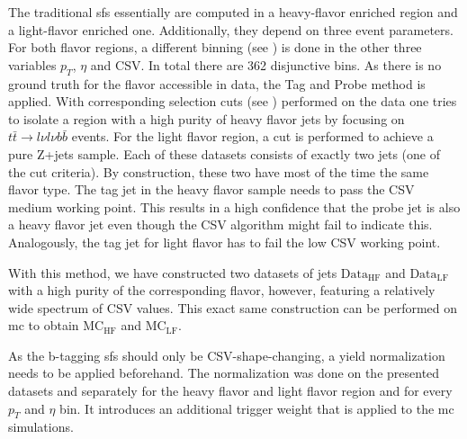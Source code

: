 \newcommand{\dahf}{\text{Data}_\text{HF}}
\newcommand{\dalf}{\text{Data}_\text{LF}}
\newcommand{\mchf}{\text{MC}_\text{HF}}
\newcommand{\mclf}{\text{MC}_\text{LF}}
\newcommand{\mchfpure}{\text{MC}_\text{HF,pure}}
\newcommand{\mchfcont}{\text{MC}_\text{HF,cont}}
\newcommand{\mclfpure}{\text{MC}_\text{LF,pure}}
\newcommand{\mclfcont}{\text{MC}_\text{LF,cont}}
The traditional \glspl{sf} essentially are computed in a heavy-flavor enriched region and a light-flavor enriched one. Additionally, they depend on three event parameters. For both flavor regions, a different binning (see ) is done in the other three variables \(p_T\), \(\eta \) and CSV\@. In total there are 362 disjunctive bins. As there is no ground truth for the flavor accessible in data, the Tag and Probe method is applied. With corresponding selection cuts (see ) performed on the data one tries to isolate a region with a high purity of heavy flavor jets by focusing on \(t\bar t \rightarrow l\nu l\nu b \bar b\) events. For the light flavor region, a cut is performed to achieve a pure Z+jets sample. Each of these datasets consists of exactly two jets (one of the cut criteria). By construction, these two have most of the time the same flavor type. The tag jet in the heavy flavor sample needs to pass the CSV medium working point. This results in a high confidence that the probe jet is also a heavy flavor jet even though the CSV algorithm might fail to indicate this. Analogously, the tag jet for light flavor has to fail the low CSV working point.

With this method, we have constructed two datasets of jets \(\dahf{}\) and \(\dalf{}\) with a high purity of the corresponding flavor, however, featuring a relatively wide spectrum of CSV values. This exact same construction can be performed on \gls{mc} to obtain \(\mchf{}\) and \(\mclf{}\).

As the b-tagging \glspl{sf} should only be CSV-shape-changing, a yield normalization needs to be applied beforehand. The normalization was done on the presented datasets and separately for the heavy flavor and light flavor region and for every \(p_T\) and \(\eta{}\) bin. It introduces an additional trigger weight that is applied to the \gls{mc} simulations.


